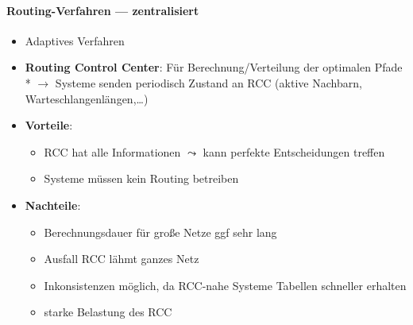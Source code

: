 \paragraph{Routing-Verfahren --- zentralisiert}
\begin{itemize}
  \item Adaptives Verfahren
  \item \textbf{Routing Control Center}: Für Berechnung/Verteilung der optimalen Pfade \\* \( \to \) Systeme senden periodisch Zustand an RCC (aktive Nachbarn, Warteschlangenlängen,\dots)
  \item \textbf{Vorteile}:
  \begin{itemize}
    \item RCC hat alle Informationen \( \leadsto \) kann perfekte Entscheidungen treffen
    \item Systeme müssen kein Routing betreiben
  \end{itemize}
  \item \textbf{Nachteile}:
  \begin{itemize}
    \item Berechnungsdauer für große Netze ggf sehr lang
    \item Ausfall RCC lähmt ganzes Netz
    \item Inkonsistenzen möglich, da RCC-nahe Systeme Tabellen schneller erhalten
    \item starke Belastung des RCC
  \end{itemize}
\end{itemize}

